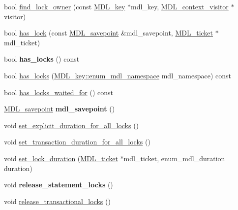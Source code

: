 \begin{DoxyCompactItemize}
\item 
bool \mbox{\hyperlink{classMDL__context_a7cf6eddf26617c84f0c2c21af8ec4a94}{find\+\_\+lock\+\_\+owner}} (const \mbox{\hyperlink{structMDL__key}{M\+D\+L\+\_\+key}} $\ast$mdl\+\_\+key, \mbox{\hyperlink{classMDL__context__visitor}{M\+D\+L\+\_\+context\+\_\+visitor}} $\ast$visitor)
\item 
bool \mbox{\hyperlink{classMDL__context_adfc9db02d0a60b144fd35770424ba1ae}{has\+\_\+lock}} (const \mbox{\hyperlink{classMDL__savepoint}{M\+D\+L\+\_\+savepoint}} \&mdl\+\_\+savepoint, \mbox{\hyperlink{classMDL__ticket}{M\+D\+L\+\_\+ticket}} $\ast$mdl\+\_\+ticket)
\item 
\mbox{\label{classMDL__context_ae36680261ff26d6eb9ea19e2a290294d}} 
bool {\bfseries has\+\_\+locks} () const
\item 
bool \mbox{\hyperlink{classMDL__context_a3ff2d2559c4ef5075b63978ae516df6e}{has\+\_\+locks}} (\mbox{\hyperlink{structMDL__key_a391ec4bd98fec6852a48f7856546ed3b}{M\+D\+L\+\_\+key\+::enum\+\_\+mdl\+\_\+namespace}} mdl\+\_\+namespace) const
\item 
bool \mbox{\hyperlink{classMDL__context_ab77b38a67ffb56d071a98efc8879bac6}{has\+\_\+locks\+\_\+waited\+\_\+for}} () const
\item 
\mbox{\label{classMDL__context_a213edf20be43313e0346a489c2f47dd6}} 
\mbox{\hyperlink{classMDL__savepoint}{M\+D\+L\+\_\+savepoint}} {\bfseries mdl\+\_\+savepoint} ()
\item 
void \mbox{\hyperlink{classMDL__context_a357599f5af7c6ec7587ecb7b349f0313}{set\+\_\+explicit\+\_\+duration\+\_\+for\+\_\+all\+\_\+locks}} ()
\item 
void \mbox{\hyperlink{classMDL__context_ad1b07243d69f1354e3bb5936dd6ded15}{set\+\_\+transaction\+\_\+duration\+\_\+for\+\_\+all\+\_\+locks}} ()
\item 
void \mbox{\hyperlink{classMDL__context_a5836b7c79f957c575c90ad4f1d8296de}{set\+\_\+lock\+\_\+duration}} (\mbox{\hyperlink{classMDL__ticket}{M\+D\+L\+\_\+ticket}} $\ast$mdl\+\_\+ticket, enum\+\_\+mdl\+\_\+duration duration)
\item 
\mbox{\label{classMDL__context_a55150d0bbe77cf0cd38e7005a4330e44}} 
void {\bfseries release\+\_\+statement\+\_\+locks} ()
\item 
void \mbox{\hyperlink{classMDL__context_afce65a72bedc0c4384b2b4c231c070ed}{release\+\_\+transactional\+\_\+locks}} ()

\end{DoxyCompactItemize}
